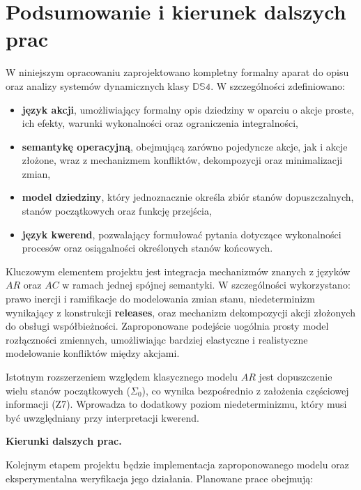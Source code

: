 \documentclass[11pt,a4paper]{article}
\theoremstyle{definition}
\begin{document}
\section{Podsumowanie i kierunek dalszych prac}

W niniejszym opracowaniu zaprojektowano kompletny formalny aparat do opisu oraz analizy systemów dynamicznych klasy $\mathbb{DS4}$. W szczególności zdefiniowano:

\begin{itemize}
    \item \textbf{język akcji}, umożliwiający formalny opis dziedziny w oparciu o akcje proste, ich efekty, warunki wykonalności oraz ograniczenia integralności,
    \item \textbf{semantykę operacyjną}, obejmującą zarówno pojedyncze akcje, jak i akcje złożone, wraz z mechanizmem konfliktów, dekompozycji oraz minimalizacji zmian,
    \item \textbf{model dziedziny}, który jednoznacznie określa zbiór stanów dopuszczalnych, stanów początkowych oraz funkcję przejścia,
    \item \textbf{język kwerend}, pozwalający formułować pytania dotyczące wykonalności procesów oraz osiągalności określonych stanów końcowych.
\end{itemize}

Kluczowym elementem projektu jest integracja mechanizmów znanych z języków $AR$ oraz $AC$ w ramach jednej spójnej semantyki. W szczególności wykorzystano:
prawo inercji i ramifikacje do modelowania zmian stanu,
niedeterminizm wynikający z konstrukcji \textbf{releases},
oraz mechanizm dekompozycji akcji złożonych do obsługi współbieżności.
Zaproponowane podejście uogólnia prosty model rozłączności zmiennych, umożliwiając bardziej elastyczne i realistyczne modelowanie konfliktów między akcjami.

Istotnym rozszerzeniem względem klasycznego modelu $AR$ jest dopuszczenie wielu stanów początkowych ($\Sigma_0$), co wynika bezpośrednio z założenia częściowej informacji (Z7). Wprowadza to dodatkowy poziom niedeterminizmu, który musi być uwzględniany przy interpretacji kwerend.

\medskip

\textbf{Kierunki dalszych prac.}

Kolejnym etapem projektu będzie implementacja zaproponowanego modelu oraz eksperymentalna weryfikacja jego działania. Planowane prace obejmują:
\end{document}
